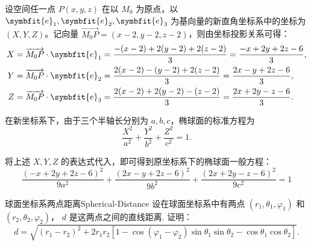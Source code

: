 \begin{solution}
    设空间任一点 $P(x, y, z)$ 在以 $M_0$ 为原点，以 $\symbfit{e}_1, \symbfit{e}_2, \symbfit{e}_3$ 为基向量的新直角坐标系中的坐标为 $(X, Y, Z)$。记向量 $\overrightarrow{M_0 P} = (x - 2, y - 2, z - 2)$，则由坐标投影关系可得：
    \begin{equation*}
        \begin{aligned}
            X & = \overrightarrow{M_0 P} \cdot \symbfit{e}_1 = \frac{-(x - 2) + 2(y - 2) + 2(z - 2)}{3} = \frac{-x + 2y + 2z - 6}{3}, \\
            Y & = \overrightarrow{M_0 P} \cdot \symbfit{e}_2 = \frac{2(x - 2) - (y - 2) + 2(z - 2)}{3} = \frac{2x - y + 2z - 6}{3},   \\
            Z & = \overrightarrow{M_0 P} \cdot \symbfit{e}_3 = \frac{2(x - 2) + 2(y - 2) - (z - 2)}{3} = \frac{2x + 2y - z - 6}{3}.
        \end{aligned}
    \end{equation*}

    在新坐标系下，由于三个半轴长分别为 $a, b, c$，椭球面的标准方程为
    \begin{equation*}
        \frac{X^2}{a^2} + \frac{Y^2}{b^2} + \frac{Z^2}{c^2} = 1.
    \end{equation*}

    将上述 $X, Y, Z$ 的表达式代入，即可得到原坐标系下的椭球面一般方程：
    \begin{equation*}
        \boxed{\frac{(-x + 2y + 2z - 6)^2}{9a^2} + \frac{(2x - y + 2z - 6)^2}{9b^2} + \frac{(2x + 2y - z - 6)^2}{9c^2} = 1}
    \end{equation*}
\end{solution}


\begin{problem}{球面坐标系两点距离}{Spherical-Distance}
    设在球面坐标系中有两点 $(r_1, \theta_1, \varphi_1)$ 和 $(r_2, \theta_2, \varphi_2)$， $d$ 是这两点之间的直线距离. 证明：
    \begin{equation*}
        d = \sqrt{(r_1 - r_2)^2 + 2r_1 r_2 [1 - \cos(\varphi_1 - \varphi_2) \sin\theta_1 \sin\theta_2 - \cos\theta_1 \cos\theta_2]}.
    \end{equation*}
\end{problem}

